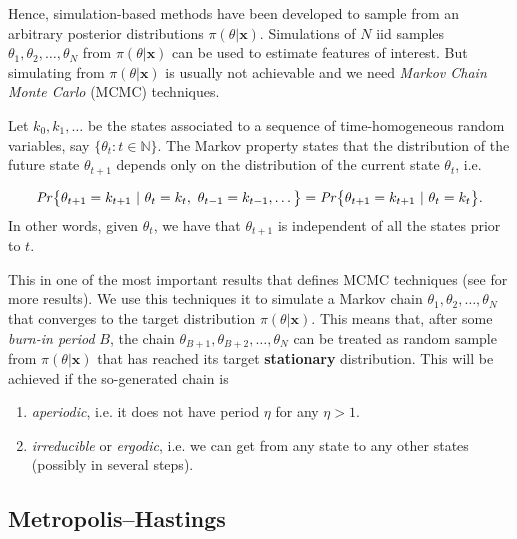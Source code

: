 Hence, simulation-based methods have been developed to sample from an arbitrary posterior distributions $\pi(\theta|\boldsymbol{x})$. Simulations of $N$ iid samples $\theta_1,\theta_2,\dots,\theta_N$ from $\pi(\theta|\boldsymbol{x})$ can be used to estimate features of interest.
But simulating from $\pi(\theta|\boldsymbol{x})$ is usually not achievable and we need \emph{Markov Chain Monte Carlo} (MCMC) techniques. 


\begin{definition}
	Let $k_0,k_1,\dots$ be the states associated to a sequence of time-homogeneous random variables, say $\big\{\theta_t:t\in\mathbb{N}\big\}$.
	The Markov property states that the distribution of the future state $\theta_{t+1}$ depends only on the distribution of the current state $\theta_{t}$,  i.e.
	
	\begin{equation}
	\text{\emph{Pr}}\big\{\theta_{t+1}=k_{t+1}\ |\ \theta_t=k_t,\ \theta_{t-1}=k_{t-1},\dots\big\} = \text{\emph{Pr}}\big\{\theta_{t+1}=k_{t+1}\ | \ \theta_t=k_t\big\}.
	\end{equation}
	In other words, given $\theta_{t}$, we have that $\theta_{t+1}$ is independent of all the states prior to $t$.
\end{definition} 
This in one of the most important results that defines MCMC techniques (see \citet[section 2.2.3]{angelino_patterns_2016} for more results).
We use this techniques it to simulate a Markov chain $\theta_1,\theta_2,\dots,\theta_N$ that converges to the target distribution $\pi(\theta|\boldsymbol{x})$.
This means that, after some \emph{burn-in period} $B$, the chain $\theta_{B+1},\theta_{B+2},\ldots,\theta_N$ can be treated as random sample from $\pi(\theta|\boldsymbol{x})$ that has reached its target \textbf{stationary} distribution. 
This will be achieved if the so-generated chain is

\begin{enumerate}
	\item \emph{aperiodic}, i.e. it does not have period $\eta$ for any $\eta>1$.
	\item \emph{irreducible} or \emph{ergodic}, i.e. we can get from any state to any other states (possibly in several steps).
\end{enumerate}




\subsection{Metropolis–Hastings}

